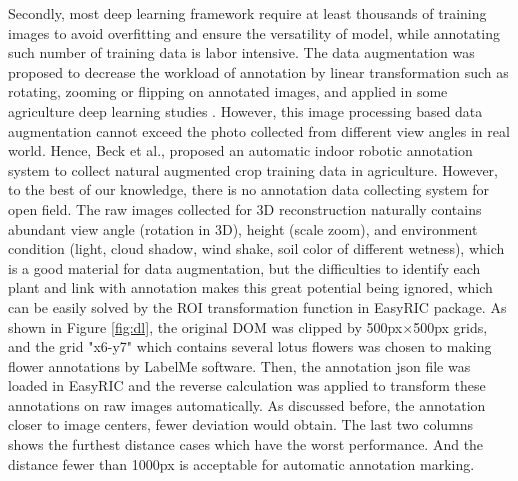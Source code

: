 \documentclass{configs/bmcart}
\begin{document}
Secondly, most deep learning framework require at least thousands of training images to avoid overfitting and ensure the versatility of model, while annotating such number of training data is labor intensive. The data augmentation was proposed to decrease the workload of annotation by linear transformation such as rotating, zooming or flipping on annotated images, and applied in some agriculture deep learning studies \cite{zhou_fast_2020, han_real-time_2020}. However, this image processing based data augmentation cannot exceed the photo collected from different view angles in real world. Hence, Beck et al.,\cite{beck_embedded_2020} proposed an automatic indoor robotic annotation system to collect natural augmented crop training data in agriculture. However, to the best of our knowledge, there is no annotation data collecting system for open field. The raw images collected for 3D reconstruction naturally contains abundant view angle (rotation in 3D), height (scale zoom), and environment condition (light, cloud shadow, wind shake, soil color of different wetness), which is a good material for data augmentation, but the difficulties to identify each plant and link with annotation makes this great potential being ignored, which can be easily solved by the ROI transformation function in EasyRIC package. As shown in Figure \ref{fig:dl}, the original DOM was clipped by 500px$\times$500px grids, and the grid "x6-y7" which contains several lotus flowers was chosen to making flower annotations by LabelMe software. Then, the annotation json file was loaded in EasyRIC and the reverse calculation was applied to transform these annotations on raw images automatically. As discussed before, the annotation closer to image centers, fewer deviation would obtain. The last two columns shows the furthest distance cases which have the worst performance. And the distance fewer than 1000px is acceptable for automatic annotation marking.
\end{document}
